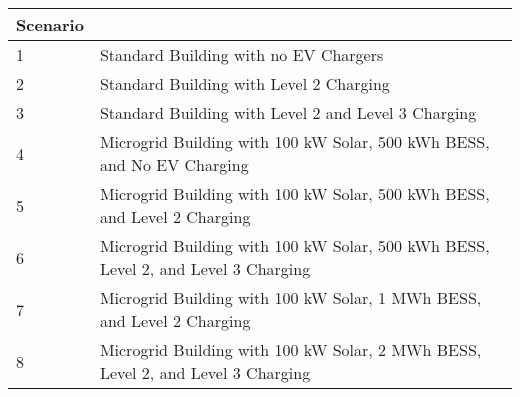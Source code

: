\begin{tabularx}{\linewidth}{l | l}
\toprule
 Scenario &  \\
\midrule
		1  & Standard Building with no EV Chargers\\
        2 & Standard Building with Level 2 Charging\\
        3 & Standard Building with Level 2 and Level 3 Charging \\
        4 &  Microgrid Building with 100 kW Solar, 500 kWh BESS, and No EV Charging\\
        5 & Microgrid Building with 100 kW Solar, 500 kWh BESS,  and Level 2 Charging\\
        6 & Microgrid Building with 100 kW Solar, 500 kWh BESS, Level 2, and Level 3 Charging\\
        7 & Microgrid Building with 100 kW Solar, 1 MWh BESS, and Level 2 Charging\\
        8 & Microgrid Building with 100 kW Solar, 2 MWh BESS, Level 2, and Level 3 Charging\\
\bottomrule
\end{tabularx}
